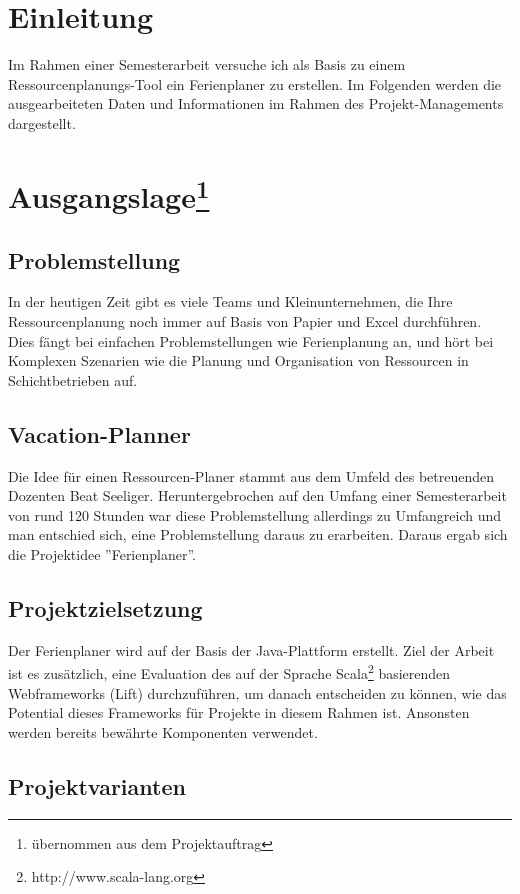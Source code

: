 \chapter*{Einleitung}
Im Rahmen einer Semesterarbeit versuche ich als Basis zu einem Ressourcenplanungs-Tool ein Ferienplaner zu erstellen. Im Folgenden werden die ausgearbeiteten Daten und Informationen im Rahmen des Projekt-Managements dargestellt.

\chapter[Ausgangslage]  {Ausgangslage\footnote{\"ubernommen aus dem Projektauftrag}} 
\section{Problemstellung}
In der heutigen Zeit gibt es viele Teams und Kleinunternehmen, die Ihre Ressourcenplanung noch immer auf Basis von Papier und Excel durchf\"uhren. Dies f\"angt bei einfachen Problemstellungen wie Ferienplanung an, und h\"ort bei Komplexen Szenarien wie die Planung und Organisation von Ressourcen in Schichtbetrieben auf.

\section{Vacation-Planner}
Die Idee f\"ur einen Ressourcen-Planer stammt aus dem Umfeld des betreuenden Dozenten Beat Seeliger. Heruntergebrochen auf den Umfang einer Semesterarbeit von rund 120 Stunden war diese Problemstellung allerdings zu Umfangreich und man entschied sich, eine Problemstellung daraus zu erarbeiten. Daraus ergab sich die Projektidee ''Ferienplaner''.

\section{Projektzielsetzung}
Der Ferienplaner wird auf der Basis der Java-Plattform erstellt. Ziel der Arbeit ist es zus\"atzlich, eine Evaluation des auf der Sprache Scala\footnote{http://www.scala-lang.org} basierenden Webframeworks (Lift) durchzuf\"uhren, um danach entscheiden zu k\"onnen,  wie das Potential dieses Frameworks f\"ur Projekte in diesem Rahmen ist. Ansonsten werden bereits bew\"ahrte Komponenten verwendet.


\section{Projektvarianten}
